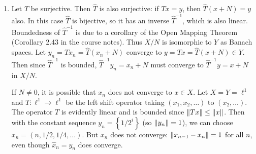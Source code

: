 \documentclass[11pt,leqno]{article}
\theoremstyle{plain}
\theoremstyle{definition}
\numberwithin{equation}{section}
\numberwithin{lem}{section}
\newcommand{\cbr}[1]{\left\{#1\right\}}
\begin{document}
\begin{enumerate}
\begin{enumerate}
    \item Let $T$ be surjective. Then $\hat T$ is also surjective: if $Tx = y$, then $\hat T(x+N) = y$ also. In this case $\hat T$ is bijective, so it has an inverse $\hat T^{-1}$, which is also linear. Boundedness of $\hat T^{-1}$ is due to a corollary of the Open Mapping Theorem (Corollary 2.43 in the course notes). Thus $X/N$ is isomorphic to $Y$ as Banach spaces. Let $y_n = Tx_n = \hat T(x_n + N)$ converge to $y = Tx = \hat T(x+N)\in Y$. Then since $\hat T^{-1}$ is bounded, $\hat T^{-1}y_n = x_n + N$ must converge to $\hat T^{-1}y = x+N$ in $X/N$. 
    
    If $N\neq 0$, it is possible that $x_n$ does not converge to $x\in X$. Let $X = Y = \ell^1$ and $T\colon \ell^1\to \ell^1$ be the left shift operator taking $(x_1,x_2,\dots)$ to $(x_2,\dots)$. The operator $T$ is evidently linear and is bounded since $\norm{Tx} \leq \norm{x}$. Then with the constant sequence $y_n = \cbr{1/2^i}$ (so $\norm{y_n}= 1$), we can choose $x_n= (n,1/2,1/4,\dots)$. But $x_n$ does not converge: $\norm{x_{n-1}-x_n} = 1$ for all $n$, even though $\hat x_n = y_n$ does converge.
  \end{enumerate}
\end{enumerate}
\end{document}
